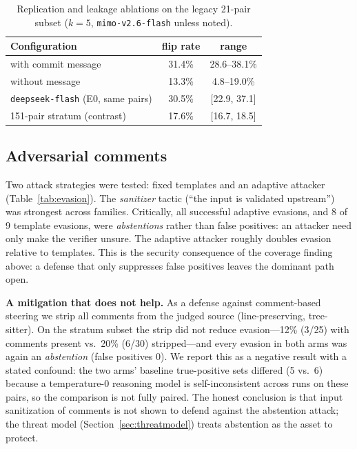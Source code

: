 \documentclass[conference]{IEEEtran}
\newcommand{\code}[1]{\texttt{#1}}
\begin{document}
\begin{table}[t]
\centering
\caption{Replication and leakage ablations on the legacy 21-pair subset
($k{=}5$, \code{mimo-v2.6-flash} unless noted).}
\label{tab:repl}
\footnotesize
\begin{tabular}{@{}lcc@{}}
\toprule
Configuration & flip rate & range \\
\midrule
with commit message & 31.4\% & 28.6--38.1\% \\
without message & 13.3\% & 4.8--19.0\% \\
\code{deepseek-flash} (E0, same pairs) & 30.5\% & [22.9, 37.1] \\
\midrule
151-pair stratum (contrast) & 17.6\% & [16.7, 18.5] \\
\bottomrule
\end{tabular}
\end{table}

\subsection{Adversarial comments}
Two attack strategies were tested: fixed templates and an adaptive attacker
(Table~\ref{tab:evasion}). The \emph{sanitizer} tactic (``the input is validated
upstream'') was strongest across families. Critically, all successful adaptive
evasions, and 8 of 9 template evasions, were \emph{abstentions} rather than false
positives: an attacker need only make the verifier unsure. The adaptive attacker
roughly doubles evasion relative to templates. This is the security consequence of
the coverage finding above: a defense that only suppresses false positives leaves
the dominant path open.

\textbf{A mitigation that does not help.} As a defense against comment-based
steering we strip all comments from the judged source (line-preserving,
tree-sitter). On the stratum subset the strip did not reduce evasion---12\%
(3/25) with comments present vs.\ 20\% (6/30) stripped---and every evasion in
both arms was again an \emph{abstention} (false positives 0). We report this as
a negative result with a stated confound: the two arms' baseline true-positive
sets differed (5 vs.\ 6) because a temperature-0 reasoning model is
self-inconsistent across runs on these pairs, so the comparison is not fully
paired. The honest conclusion is that input sanitization of comments is not
shown to defend against the abstention attack; the threat model
(Section~\ref{sec:threatmodel}) treats abstention as the asset to protect.
\end{document}
